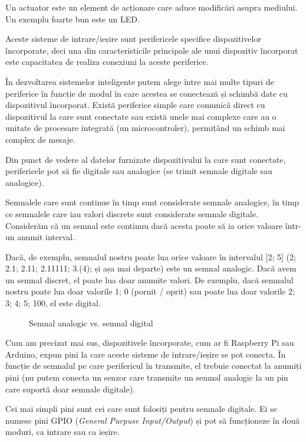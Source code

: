 Un actuator este un element de acționare care aduce modificări asupra mediului.
Un exemplu foarte bun este un LED.

Aceste sisteme de intrare/ieșire sunt perifericele specifice dispozitivelor
încorporate, deci una din caracteristicile principale ale unui dispozitiv
încorporat este capacitatea de realiza conexiuni la aceste periferice.

În dezvoltarea sistemelor inteligente putem alege între mai multe tipuri de
periferice în funcție de modul în care acestea se conectează și schimbă date cu
dispozitivul încorporat. Există periferice simple care comunică direct cu
dispozitivul la care sunt conectate sau există unele mai complexe care au o
unitate de procesare integrată (un microcontroler), permițând un schimb mai
complex de mesaje.

Din punct de vedere al datelor furnizate dispozitivului la care sunt conectate,
perifericele pot să fie digitale sau analogice (se trimit semnale digitale sau
analogice).

Semnalele care sunt continue în timp sunt considerate semnale analogice, în timp
ce semnalele care iau valori discrete sunt considerate semnale digitale.
Considerăm că un semnal este continuu dacă acesta poate să ia orice valoare
într-un anumit interval.

Dacă, de exemplu, semnalul nostru poate lua orice valoare în intervalul [2; 5]
(2; 2.1; 2.11; 2.11111; 3.(4); și așa mai departe) este un semnal analogic. Dacă
avem un semnal discret, el poate lua doar anumite valori. De exemplu, dacă
semnalul nostru poate lua doar valorile {1; 0} (pornit / oprit) sau poate lua
doar valorile {2; 3; 4; 5; 100}, el este digital.

\begin{figure}[htbp]
	\centering
	\def\svgwidth{\columnwidth}
	
	\caption{Semnal analogic vs. semnal digital}
	\label{fig:embed-analog-digital}
\end{figure}

Cum am precizat mai sus, dispozitivele încorporate, cum ar fi Raspberry Pi sau
Arduino, expun pini la care aceste sisteme de intrare/ieșire se pot conecta. În
funcție de semnalul pe care perifericul în transmite, el trebuie conectat la
anumiți pini (nu putem conecta un senzor care transmite un semnal analogic la un
pin care suportă doar semnale digitale).

Cei mai simpli pini sunt cei care sunt folosiți pentru semnale digitale. Ei se numesc pini
GPIO (\textit{General Purpuse Input/Output}) și pot să funcționeze în două moduri, ca
intrare sau ca ieșire.

